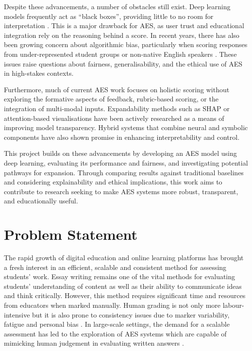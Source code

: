\documentclass[10pt]{report}
\begin{document}
Despite these advancements, a number of obstacles still exist. Deep learning models frequently act as ``black boxes'', providing little to no room for interpretation \parencite{lundberg2017unified}. This is a major drawback for AES, as user trust and educational integration rely on the reasoning behind a score. In recent years, there has also been growing concern about algorithmic bias, particularly when scoring responses from under-represented student groups or non-native English speakers \parencite{blodgett2020language}. These issues raise questions about fairness, generalisability, and the ethical use of AES in high-stakes contexts.

Furthermore, much of current AES work focuses on holistic scoring without exploring the formative aspects of feedback, rubric-based scoring, or the integration of multi-modal inputs. Expandability methods such as SHAP \parencite{lundberg2017unified} or attention-based visualisations have been actively researched as a means of improving model transparency. Hybrid systems that combine neural and symbolic components have also shown promise in enhancing interpretability and control.

This project builds on these advancements by developing an AES model using deep learning, evaluating its performance and fairness, and investigating potential pathways for expansion. Through comparing 
results against traditional baselines and considering explainability and ethical implications, this work aims to contribute to research seeking to make AES systems more robust, transparent, and educationally useful.

\section{Problem Statement}
The rapid growth of digital education and online learning platforms has brought a fresh interest in an efficient, scalable and consistent method for assessing students' work. Essay writing remains one of the vital methods for evaluating students' understanding of content as well as their ability to communicate ideas and think critically. However, this method requires significant time and resources from educators when marked manually. Human grading is not only more labour-intensive but it is also prone to consistency issues due to marker variability, fatigue and personal bias \parencite{page2003}. In large-scale settings, the demand for a scalable assessment has led to the exploration of AES systems which are capable of mimicking human judgement in evaluating written answers \parencite{burstein2003criterion}.
\end{document}
